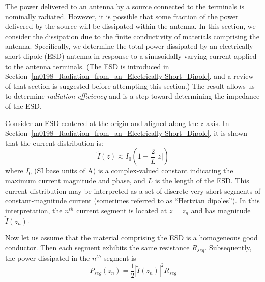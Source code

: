 

\label{m0208_Total_Power_Dissipated_by_an_Electrically-Short_Dipole} %

The power delivered to an antenna by a source connected to the terminals is nominally radiated.
However, it is possible that some fraction of the power delivered by the source will be dissipated within the antenna. 
In this section, we consider the dissipation due to the finite conductivity of materials comprising the antenna.
Specifically, we determine the total power dissipated by an electrically-short dipole (ESD) antenna in response to a sinusoidally-varying current applied to the antenna terminals.  
(The ESD is introduced in Section~\ref{m0198_Radiation_from_an_Electrically-Short_Dipole}, and a review of that section is suggested before attempting this section.)
The result allows us to determine \emph{radiation efficiency} 
and is a step toward determining the impedance of the ESD.

Consider an ESD centered at the origin and aligned along the $z$ axis.
In Section~\ref{m0198_Radiation_from_an_Electrically-Short_Dipole}, it is shown that the current distribution is:
%
\begin{equation}
\widetilde{I}(z) \approx I_0 \left(1-\frac{2}{L}\left|z\right|\right) 
\label{m0208_eI}
\end{equation}
%
where $I_0$ (SI base units of A) is a complex-valued constant indicating the maximum current magnitude and phase, 
and $L$ is the length of the ESD.
This current distribution may be interpreted as a set of discrete very-short segments of constant-magnitude current (sometimes referred to as ``Hertzian dipoles'').
In this interpretation, the $n^{th}$ current segment is located at $z=z_n$ and has magnitude $\widetilde{I}(z_n)$.

Now let us assume that the material comprising the ESD is a homogeneous good conductor.
Then each segment exhibits the same resistance $R_{seg}$.
Subsequently, the power dissipated in the $n^{th}$ segment is 
%
\begin{equation}
P_{seg}(z_n) = \frac{1}{2}\left|\widetilde{I}(z_n)\right|^2 R_{seg}
\label{m0208_ePseg1}
\end{equation}

